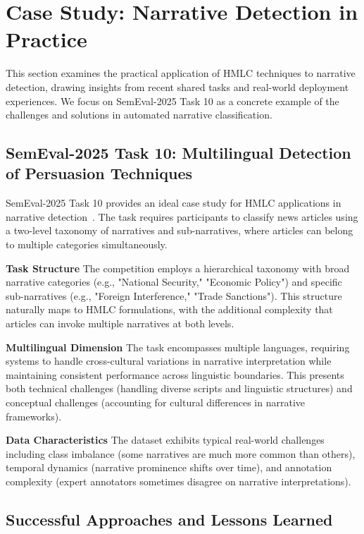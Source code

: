 
\section{Case Study: Narrative Detection in Practice}

This section examines the practical application of HMLC techniques to narrative detection, drawing insights from recent shared tasks and real-world deployment experiences. We focus on SemEval-2025 Task 10 as a concrete example of the challenges and solutions in automated narrative classification.

\subsection{SemEval-2025 Task 10: Multilingual Detection of Persuasion Techniques}

SemEval-2025 Task 10 provides an ideal case study for HMLC applications in narrative detection~\cite{semeval2025task10}. The task requires participants to classify news articles using a two-level taxonomy of narratives and sub-narratives, where articles can belong to multiple categories simultaneously.

\textbf{Task Structure} The competition employs a hierarchical taxonomy with broad narrative categories (e.g., "National Security," "Economic Policy") and specific sub-narratives (e.g., "Foreign Interference," "Trade Sanctions"). This structure naturally maps to HMLC formulations, with the additional complexity that articles can invoke multiple narratives at both levels.

\textbf{Multilingual Dimension} The task encompasses multiple languages, requiring systems to handle cross-cultural variations in narrative interpretation while maintaining consistent performance across linguistic boundaries. This presents both technical challenges (handling diverse scripts and linguistic structures) and conceptual challenges (accounting for cultural differences in narrative frameworks).

\textbf{Data Characteristics} The dataset exhibits typical real-world challenges including class imbalance (some narratives are much more common than others), temporal dynamics (narrative prominence shifts over time), and annotation complexity (expert annotators sometimes disagree on narrative interpretations).

\subsection{Successful Approaches and Lessons Learned}


